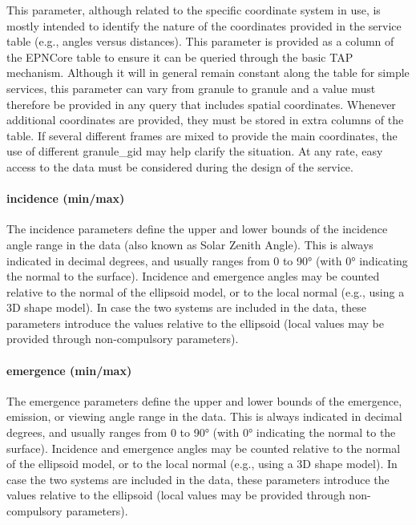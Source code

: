 \documentclass[11pt,a4paper]{ivoa}
\begin{document}
This parameter, although related to the specific coordinate system in use,
is mostly intended to identify the nature of the coordinates provided in
the service table (e.g., angles versus distances). This parameter is
provided as a column of the EPNCore table to ensure it can be queried
through the basic TAP mechanism. Although it will in general remain
constant along the table for simple services, this parameter can vary from
granule to granule and a value must therefore be provided in any query
that includes spatial coordinates. Whenever additional coordinates are
provided, they must be stored in extra columns of the table. If several
different frames are mixed to provide the main coordinates, the use of
different granule\_gid may help clarify the situation. At any rate, easy
access to the data must be considered during the design of the service.

\paragraph{incidence (min/max)}

The incidence parameters define the upper and lower bounds of the
incidence angle range in the data (also known as Solar Zenith Angle).
This is always indicated in decimal degrees, and usually ranges from 0 to
90° (with 0° indicating the normal to the surface). Incidence and
emergence angles may be counted relative to the normal of the ellipsoid
model, or to the local normal (e.g., using a 3D shape model). In case
the two systems are included in the data, these parameters introduce the
values relative to the ellipsoid (local values may be provided through
non-compulsory parameters).

\paragraph{emergence (min/max)}

The emergence parameters define the upper and lower bounds of the
emergence, emission, or viewing angle range in the data. This is always
indicated in decimal degrees, and usually ranges from 0 to 90° (with
0° indicating the normal to the surface). Incidence and emergence angles
may be counted relative to the normal of the ellipsoid model, or to the
local normal (e.g., using a 3D shape model). In case the two systems
are included in the data, these parameters introduce the values relative
to the ellipsoid (local values may be provided through non-compulsory
parameters).
\end{document}
